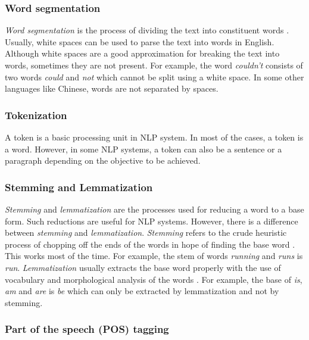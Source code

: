 \subsubsection{Word segmentation}

\textit{Word segmentation} is the process of dividing the text into constituent words \cite{wiki:sentSeg}. Usually, white spaces can be used to parse the text into words in English. Although white spaces are a good approximation for breaking the text into words, sometimes they are not present. For example, the word \textit{couldn't} consists of two words \textit{could} and \textit{not} which cannot be split using a white space. In some other languages like Chinese, words are not separated by spaces.

\subsubsection{Tokenization}

A token is a basic processing unit in NLP system. In most of the cases, a token is a word. However, in some NLP systems, a token can also be a sentence or a paragraph depending on the objective to be achieved.

\subsubsection{Stemming and Lemmatization}

\textit{Stemming} and \textit{lemmatization} are the processes used for reducing a word to a base form. Such reductions are useful for NLP systems. However, there is a difference between \textit{stemming} and \textit{lemmatization}. \textit{Stemming} refers to the crude heuristic process of chopping off the ends of the words in hope of finding the base word \cite{stemminglemmatization}. This works most of the time. For example, the stem of words \textit{running} and \textit{runs} is \textit{run}. \textit{Lemmatization} usually extracts the base word properly with the use of vocabulary and morphological analysis of the words \cite{stemminglemmatization}. For example, the base of \textit{is}, \textit{am} and \textit{are} is \textit{be} which can only be extracted by lemmatization and not by stemming.

\subsubsection{Part of the speech (POS) tagging}

